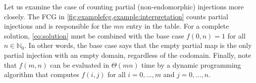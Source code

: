 Let us examine the case of counting partial (non-endomorphic) injections more
closely. The FCG in \cref{fig:examplefcg,example:interpretation} counts partial
injections and is responsible for the $mn$ entry in the table. For a complete
solution, \cref{eq:solution} must be combined with the base case $f(0, n) = 1$
for all $n \in \mathbb{N}_{0}$. In other words, the base case says that the
empty partial map is the only partial injection with an empty domain, regardless
of the codomain. Finally, note that $f(m, n)$ can be evaluated in $\Theta(mn)$
time by a dynamic programming algorithm that computes $f(i, j)$ for all
$i = 0, \dots, m$ and $j = 0, \dots, n$.



